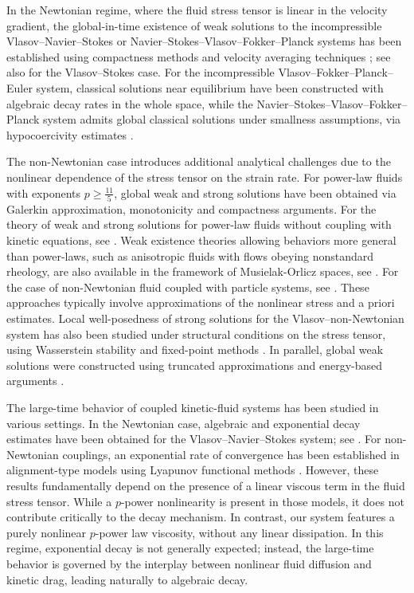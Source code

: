 \documentclass[10pt,reqno]{amsart}
\numberwithin{equation}{section}
\begin{document}
In the Newtonian regime, where the fluid stress tensor is linear in the velocity gradient, the global-in-time existence of weak solutions to the incompressible Vlasov--Navier--Stokes or Navier--Stokes--Vlasov--Fokker--Planck systems has been established using compactness methods and velocity averaging techniques \cite{BDGM09, BGM17, CCK16, CKL11,  CJ23,LLY22, Yu13}; see also \cite{Ham98} for the Vlasov--Stokes case. For the incompressible Vlasov--Fokker--Planck--Euler system, classical solutions near equilibrium have been constructed with algebraic decay rates \cite{CDM11} in the whole space, while the Navier--Stokes--Vlasov--Fokker--Planck system admits global classical solutions under smallness assumptions, via hypocoercivity estimates \cite{GMZ10}.

The non-Newtonian case introduces additional analytical challenges due to the nonlinear dependence of the stress tensor on the strain rate. For power-law fluids with exponents $p \geq \frac{11}{5}$, global weak and strong solutions have been obtained via Galerkin approximation, monotonicity and compactness arguments.  For the theory of weak and strong solutions for power-law fluids without coupling with kinetic equations, see \cite{MNRR96}. Weak existence theories allowing behaviors more general than power-laws, such as anisotropic fluids with flows obeying nonstandard rheology, are also available in the framework of Musielak-Orlicz spaces, see \cite{CGSW2021, W2013}. 
For the case of non-Newtonian fluid coupled with particle systems, see \cite{MPP18, ZFG24}. These approaches typically involve approximations of the nonlinear stress and a priori estimates. Local well-posedness of strong solutions for the Vlasov--non-Newtonian system has also been studied under structural conditions on the stress tensor, using Wasserstein stability and fixed-point methods \cite{KKK23}. In parallel, global weak solutions were constructed using truncated approximations and energy-based arguments \cite{ZFG24}.

The large-time behavior of coupled kinetic-fluid systems has been studied in various settings. In the Newtonian case, algebraic and exponential decay estimates have been obtained for the Vlasov--Navier--Stokes system; see \cite{Choi16, Han22, HMM20}. For non-Newtonian couplings, an exponential rate of convergence has been established in alignment-type models using Lyapunov functional methods \cite{HKKP18, MPP18}. However, these results fundamentally depend on the presence of a linear viscous term in the fluid stress tensor. While a $p$-power nonlinearity is present in those models, it does not contribute critically to the decay mechanism. In contrast, our system features a purely nonlinear $p$-power law viscosity, without any linear dissipation. In this regime, exponential decay is not generally expected; instead, the large-time behavior is governed by the interplay between nonlinear fluid diffusion and kinetic drag, leading naturally to algebraic decay.
 
\end{document}
